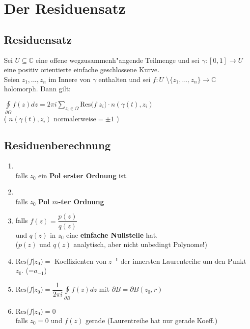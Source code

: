 
\section{Der Residuensatz}
\subsection{Residuensatz}
Sei $U \subseteq \mathbb{C} $ eine offene wegzusammenh"angende Teilmenge und sei $\gamma : [0, 1] \rightarrow U$ eine positiv orientierte einfache geschlossene Kurve. \\
Seien $z_1, ..., z_n$ im Innere von $\gamma$ enthalten und sei $f : U$ \textbackslash $ \{z_1 , ..., z_n \} \rightarrow \mathbb{C}$ holomorph. Dann gilt:
	
	

\(\displaystyle \oint\limits_{\partial \Omega} f(z) dz =
2\pi i \sum\limits_{z_i \in \Omega} \text{Res}\big(f \big\vert z_i\big) \cdot n(\gamma(t), z_i)\)\\
( \( n\left(\gamma (t), z_i\right) \text{ normalerweise} = \pm 1 \) )

\subsection{Residuenberechnung}
\begin{enumerate}
	\item	{}\\
	falls \(z_0\) ein \textbf{Pol erster Ordnung} ist.
	\item	{}\\
	falls \(z_0\) \textbf{Pol \(m\)-ter Ordnung}\\
	\item	{} \qquad falls \(f(z) = \dfrac{p(z)}{q(z)}\)\\
	und \(q(z)\) in \(z_0\) eine \textbf{einfache Nullstelle} hat.\\
	(\( p(z) \) und \( q(z) \) analytisch, aber nicht unbedingt Polynome!)
	\item	\( \text{Res}\big(f \big\vert z_0\big) = \) Koeffizienten von \(z^{-1}\) der innersten Laurentreihe
	um den Punkt \(z_0\). (=\(a_{-1}\))
	\item	\( \text{Res}\big(f \big\vert z_0\big) = \dfrac{1}{2\pi i} \oint\limits_{\partial B} f(z) dz \) \qquad
	mit \(\partial B = \partial B(z_0,r)\)
	\item	\( \text{Res}\big(f \big\vert z_0\big) = 0\)\\
	falls \(z_0 = 0\) und  \(f(z)\) gerade (Laurentreihe hat nur gerade Koeff.)
\end{enumerate}

